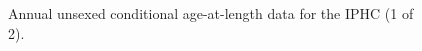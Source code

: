 \documentclass[
]{scrartcl}
\begin{document}
\begin{figure}


\caption{\label{fig-IPHC_agecomps1}Annual unsexed conditional
age-at-length data for the IPHC (1 of 2).}

\end{figure}%
\end{document}
